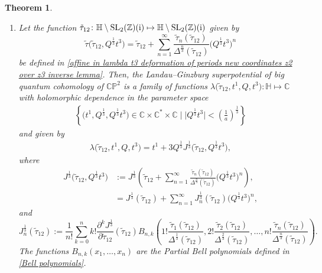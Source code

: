 \documentclass[pdftex]{sigma}
\numberwithin{equation}{section}
\newtheorem{Theorem}{Theorem}[section]
\begin{document}
\begin{Theorem}\quad
\begin{enumerate}\itemsep=0pt
\item[$(1)$]
Let the function
$
\tilde\tau_{12}\colon \mathbb{H}\setminus{ {\rm SL}_2(\mathbb{Z})({\rm i})} \mapsto \mathbb{H}\setminus{ {\rm SL}_2(\mathbb{Z})({\rm i})}
$
given by
\[
\tilde\tau\bigl(\tilde\tau_{12},Q^{\frac{1}{3}}t^3\bigr)=\tilde\tau_{12}+\sum_{n=1}^{\infty}\frac{\tilde\tau_{n}(\tilde\tau_{12})}{\Delta^{\frac{n}{3}}(\tilde\tau_{12})} \bigl( Q^{\frac{1}{3}}t^3\bigr)^n
\]
be defined in \eqref{affine in lambda t3 deformation of periods new coordinates z2 over z3 inverse lemma}.
Then, the Landau--Ginzburg superpotential of big quantum cohomology of $\mathbb{CP}^2$ is a family of functions
$
\lambda\bigl(\tilde\tau_{12}, t^1, Q, t^3\bigr)\colon \mathbb{H} \mapsto \mathbb{C}
$
with holomorphic dependence in the parameter space
\begin{gather*}
\left\{\bigl(t^1,Q^{\frac{1}{3}}, Q^{\frac{1}{3}}t^3\bigr) \in \mathbb{C}\times\mathbb{C}^{*}\times \mathbb{C}\mid \big|Q^{\frac{1}{3}}t^3\big|<\left(\frac{1}{a}\right)^{\frac{1}{3}} \right\}
\end{gather*}
and given by
\begin{gather}\label{lg superpotential of small quantum cohomology j function big quantum cohomology main body}
\lambda\bigl(\tilde\tau_{12}, t^1, Q, t^3\bigr)=t^1+3Q^{\frac{1}{3}}J^{\frac{1}{3}}\bigl(\tilde\tau_{12}, Q^{\frac{1}{3}}t^3\bigr),
\end{gather}
where
\begin{align}
J^{\frac{1}{3}}\bigl(\tilde\tau_{12}, Q^{\frac{1}{3}}t^3\bigr)&:=J^{\frac{1}{3}}\left(\tilde\tau_{12}+\sum_{n=1}^{\infty}\frac{\tilde\tau_{n}(\tilde\tau_{12})}{\Delta^{\frac{n}{3}}(\tilde\tau_{12})} \bigl( Q^{\frac{1}{3}}t^3\bigr)^n\right),\nonumber\\
&=J^{\frac{1}{3}}(\tilde\tau_{12})+\sum_{n=1}^{\infty}J_n^{\frac{1}{3}}(\tilde\tau_{12})\bigl( Q^{\frac{1}{3}}t^3\bigr)^n,\label{definition of t3 deformation of gamma2}
\end{align}
and
\[
J_n^{\frac{1}{3}}(\tilde\tau_{12}):=\frac{1}{n!}\sum_{k=0}^n k!\frac{\partial^kJ^{\frac{1}{3}}}{\partial\tilde\tau_{12}}(\tilde\tau_{12}) B_{n,k}\left( 1!\frac{\tilde\tau_{1}(\tilde\tau_{12})}{\Delta^{\frac{1}{3}}(\tilde\tau_{12})} ,2!\frac{\tilde\tau_{2}(\tilde\tau_{12})}{\Delta^{\frac{2}{3}}(\tilde\tau_{12})},\dots,n!\frac{\tilde\tau_{n}(\tilde\tau_{12})}{\Delta^{\frac{n}{3}}(\tilde\tau_{12})}\right).
\]
The functions $B_{n,k}(x_1,\dots,x_n)$ are the Partial Bell polynomials defined in \eqref{Bell polynomials}.


\end{enumerate}
\end{Theorem}
\end{document}
